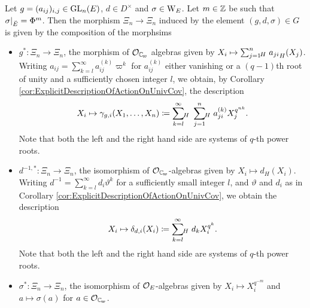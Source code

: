 \documentclass[../main.tex]{subfiles}
\begin{document}
\begin{lem}\label{lem:ExplicitActionOnQthPowerRootSystems}
  Let $g = (a_{ij})_{i,j} \in \operatorname{GL}_n(E)$, $d \in D^\times$ and $\sigma \in
  \mathrm W_E$. Let $m \in \mathbb{Z}$ be such that $\sigma|_{{\breve {E}}} = \Phi^m$. Then the
  morphism $\Xi_n \to \Xi_n$ induced by the element $(g, d, \sigma) \in G$ is given by
  the composition of the morphsims
  \begin{itemize}
    \item $g^*\colon \Xi_n \to \Xi_n$, the morphism of $\cO_\Cp$ algebras given
      by $X_i \mapsto \sum_{j=1}^n {\hspace{-3pt}}_H\hspace{3pt} {a_{ji}}_H(X_j)$. Writing
      $a_{ij} = \sum_{k=l}^\infty a_{ij}^{(k)} \varpi^k$ for  $a_{ij}^{(k)}$
      either vanishing or a $(q-1)$th root of unity and a sufficiently chosen integer
      $l$, we obtain, by Corollary
      \ref{cor:ExplicitDescriptionOfActionOnUnivCov}, the description
      \begin{equation*}
        X_i \mapsto \gamma_{g,i}(X_1, \dots, X_n) \coloneqq 
        \sum_{k=l}^\infty {\hspace{-3pt}}_H\hspace{3pt}
        \sum_{j=1}^n{\hspace{-3pt}}_H\hspace{3pt} a_{ji}^{(k)} X_j^{q^{nk}}.
      \end{equation*}
      Note that both the left and the right hand side are systems of $q$-th power roots.

    \item $d^{-1,*} \colon \Xi_n \to \Xi_n$, the isomorphism of 
      $\cO_\Cp$-algebras given by $X_i \mapsto d_H(X_i)$. 
      Writing $d^{-1} = \sum_{k=l}^\infty d_i \vartheta^k$ for
       a sufficiently small integer $l$, and $\vartheta$ and $d_i$ as in
       Corollary \ref{cor:ExplicitDescriptionOfActionOnUnivCov}, we obtain the
       description
      \begin{equation*}
        X_i \mapsto \delta_{d, i}(X_i) \coloneqq \sum_{k=l}^\infty
        {\hspace{-3pt}}_H\hspace{3pt} d_k X_i^{q^{k}}.
      \end{equation*}
      Note that both the left and the right hand side are systems of $q$-th power roots.

    \item $\sigma^*\colon \Xi_n \to \Xi_n$, the isomorphism of 
      $\mathcal{O}_E$-algebras given by $X_i \mapsto X_i^{q^{-m}}$ and 
      $a \mapsto \sigma(a)$ for $a \in \cO_\Cp$. 
  \end{itemize}
\end{lem}
\end{document}
